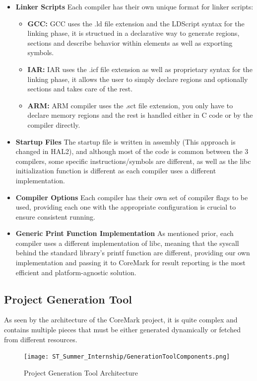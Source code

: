 \begin{itemize}
    \item \textbf{Linker Scripts}
    Each compiler has their own unique format for linker scripts:
    \begin{itemize}
        \item \textbf{GCC:} GCC uses the .ld file extension and the LDScript syntax for the linking phase, it is structued in a declarative way to generate regions, sections and describe behavior within elements as well as exporting symbols.
        \item \textbf{IAR:} IAR uses the .icf file extension as well as proprietary syntax for the linking phase, it allows the user to simply declare regions and optionally sections and takes care of the rest.
        \item \textbf{ARM:} ARM compiler uses the .sct file extension, you only have to declare memory regions and the rest is handled either in C code or by the compiler directly.
    \end{itemize}
    \item \textbf{Startup Files} The startup file is written in assembly (This approach is changed in HAL2), and although most of the code is common between the 3 compilers, some specific instructions/symbols are different, as well as the libc initialization function is different as each compiler uses a different implementation.
    \item \textbf{Compiler Options} Each compiler has their own set of compiler flags to be used, providing each one with the appropriate configuration is crucial to ensure consistent running.
    \item \textbf{Generic Print Function Implementation} As mentioned prior, each compiler uses a different implementation of libc, meaning that the syscall behind the standard library's printf function are different, providing our own implementation and passing it to CoreMark for result reporting is the most efficient and platform-agnostic solution.
\end{itemize}
\subsection{Project Generation Tool}
As seen by the architecture of the CoreMark project, it is quite complex and contains multiple pieces that must be either generated dynamically or fetched from different resources. 
\begin{figure}[H]
    \centering
    \texttt{[image: ST\_Summer\_Internship/GenerationToolComponents.png]}
    \caption{Project Generation Tool Architecture}
    \label{fig:gen_tool_arch}
\end{figure}

